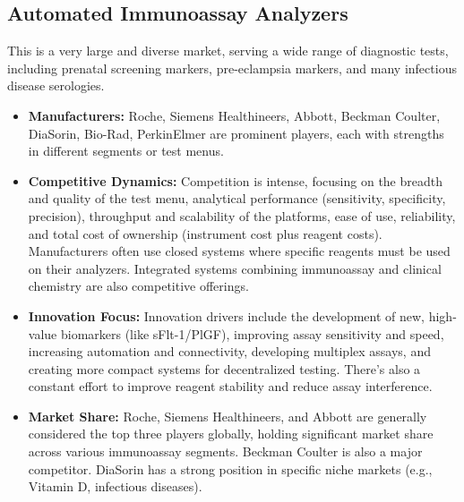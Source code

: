 \documentclass{article}
\begin{document}
\subsection{Automated Immunoassay Analyzers}
This is a very large and diverse market, serving a wide range of diagnostic tests, including prenatal screening markers, pre-eclampsia markers, and many infectious disease serologies.
\begin{itemize}
    \item \textbf{Manufacturers:} Roche, Siemens Healthineers, Abbott, Beckman Coulter, DiaSorin, Bio-Rad, PerkinElmer are prominent players, each with strengths in different segments or test menus.
    \item \textbf{Competitive Dynamics:} Competition is intense, focusing on the breadth and quality of the test menu, analytical performance (sensitivity, specificity, precision), throughput and scalability of the platforms, ease of use, reliability, and total cost of ownership (instrument cost plus reagent costs). Manufacturers often use closed systems where specific reagents must be used on their analyzers. Integrated systems combining immunoassay and clinical chemistry are also competitive offerings.
    \item \textbf{Innovation Focus:} Innovation drivers include the development of new, high-value biomarkers (like sFlt-1/PlGF), improving assay sensitivity and speed, increasing automation and connectivity, developing multiplex assays, and creating more compact systems for decentralized testing. There's also a constant effort to improve reagent stability and reduce assay interference.
    \item \textbf{Market Share:} Roche, Siemens Healthineers, and Abbott are generally considered the top three players globally, holding significant market share across various immunoassay segments. Beckman Coulter is also a major competitor. DiaSorin has a strong position in specific niche markets (e.g., Vitamin D, infectious diseases).
\end{itemize}
\end{document}
